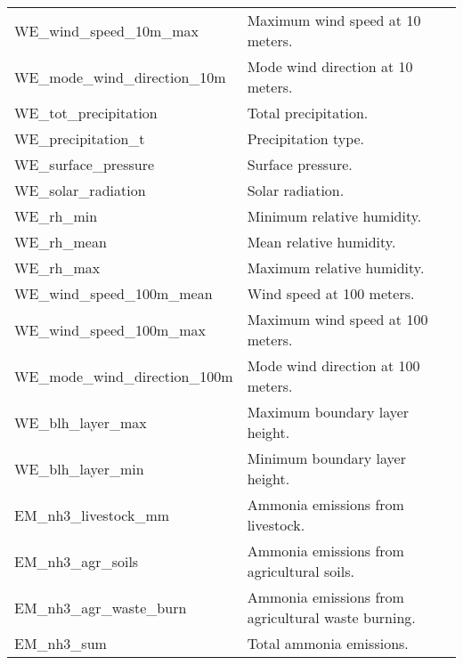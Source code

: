 \documentclass[11pt,a4paper]{article}
\begin{document}
\begin{table}[H]
\begin{tabular}{|l|l|}
        WE\_wind\_speed\_10m\_max       & Maximum wind speed at 10 meters.                                \\
        WE\_mode\_wind\_direction\_10m  & Mode wind direction at 10 meters.                               \\
        WE\_tot\_precipitation          & Total precipitation.                                            \\
        WE\_precipitation\_t            & Precipitation type.                                             \\
        WE\_surface\_pressure           & Surface pressure.                                               \\
        WE\_solar\_radiation            & Solar radiation.                                                \\
        WE\_rh\_min                     & Minimum relative humidity.                                      \\
        WE\_rh\_mean                    & Mean relative humidity.                                         \\
        WE\_rh\_max                     & Maximum relative humidity.                                      \\
        WE\_wind\_speed\_100m\_mean     & Wind speed at 100 meters.                                       \\
        WE\_wind\_speed\_100m\_max      & Maximum wind speed at 100 meters.                               \\
        WE\_mode\_wind\_direction\_100m & Mode wind direction at 100 meters.                              \\
        WE\_blh\_layer\_max             & Maximum boundary layer height.                                  \\ %
        WE\_blh\_layer\_min             & Minimum boundary layer height.                                  \\ %
        EM\_nh3\_livestock\_mm          & Ammonia emissions from livestock.                               \\
        EM\_nh3\_agr\_soils             & Ammonia emissions from agricultural soils.                      \\
        EM\_nh3\_agr\_waste\_burn       & Ammonia emissions from agricultural waste burning.              \\
        EM\_nh3\_sum                    & Total ammonia emissions.                                        \\

\end{tabular}
\end{table}
\end{document}
